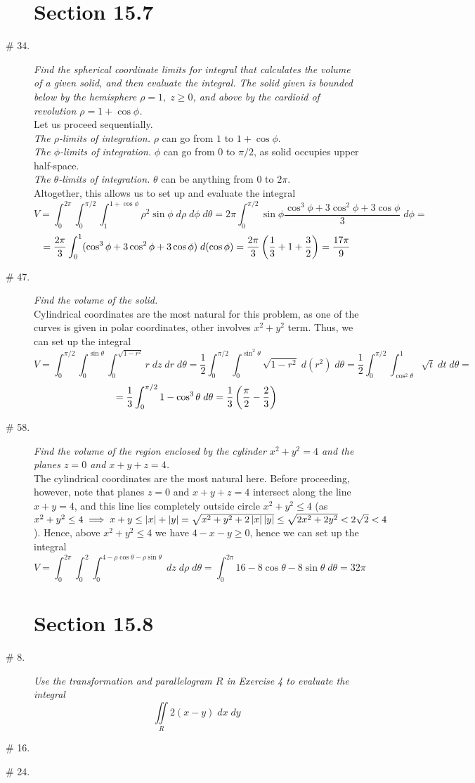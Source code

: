 \documentclass[8pt]{article} %
\newcommand{\dx}{\;dx}
\newcommand{\dy}{\;dy}
\newcommand{\dz}{\;dz}
\newcommand{\dr}{\;dr}
\newcommand{\dph}{\;d\phi}
\newcommand{\drh}{\;d\rho}
\newcommand{\dt}{\;d\theta}
\begin{document}
\begin{description}
\section{Section 15.7}
	\item[\# 34.]{{\it Find the spherical coordinate limits for integral that calculates the volume of a given solid, and then
		evaluate the integral. The solid given is bounded below by the hemisphere $\rho=1,\;z\geq0$, and above by the
		cardioid of revolution $\rho=1+\cos\phi$.}\\
		Let us proceed sequentially.\\
		{\it The $\rho$-limits of integration.} $\rho$ can go from $1$ to $1+\cos\phi$.\\
		{\it The $\phi$-limits of integration.} $\phi$ can go from $0$ to $\pi/2$, as solid occupies upper half-space.\\
		{\it The $\theta$-limits of integration.} $\theta$ can be anything from $0$ to $2\pi$.\\
		Altogether, this allows us to set up and evaluate the integral
		\[V=\int_0^{2\pi}\int_0^{\pi/2}\int_1^{1+\cos\phi}\rho^2\sin\phi\drh\dph\dt=2\pi\int_0^{\pi/2}\sin\phi\frac
		{\cos^3\phi+3\cos^2\phi+3\cos\phi}{3}\dph=\]
		\[=\frac{2\pi}{3}\int_0^1(\cos^3\phi+3\cos^2\phi+3\cos\phi)\;d(\cos\phi)=\frac{2\pi}{3}\left(\frac{1}{3}+1+\frac{3}
		{2}\right)=\frac{17\pi}{9}\]
		}
	\item[\# 47.]{{\it Find the volume of the solid.\\}
		Cylindrical coordinates are the most natural for this problem, as one of the curves is given in polar coordinates,
		other involves $x^2+y^2$ term. Thus, we can set up the integral
		\[V=\int_0^{\pi/2}\int_0^{\sin\theta}\int_0^{\sqrt{1-r^2}}r\dz\dr\dt=\frac{1}{2}\int_0^{\pi/2}\int_0^{\sin^2\theta}
		\sqrt{1-r^2}\;d(r^2)\dt=\frac{1}{2}\int_0^{\pi/2}\int_{\cos^2\theta}^1\sqrt t\;dt\dt=\]
		\[=\frac{1}{3}\int_0^{\pi/2}1-\cos^3\theta\dt=\frac{1}{3}\mybra{\frac{\pi}{2}-\frac{2}{3}}\]
		}
	\item[\# 58.]{{\it Find the volume of the region enclosed by the cylinder $x^2+y^2=4$ and the planes $z=0$ and $x+y+z=4$.}\\
		The cylindrical coordinates are the most natural here. Before proceeding, however, note that planes $z=0$
		and $x+y+z=4$ intersect along the line $x+y=4$, and this line lies completely outside circle $x^2+y^2\leq 4$ (as
		$x^2+y^2\leq 4\implies x+y\leq\left|x\right|+\left|y\right|=\sqrt{x^2+y^2+2\left|x\right|\left|y\right|}\leq \sqrt{2x^2+2y^2}<2\sqrt{2}<4$
		). Hence, above $x^2+y^2\leq 4$ we have $4-x-y\geq 0$, hence we can set up the integral
		\[V=\int_0^{2\pi}\int_0^2\int_0^{4-\rho\cos\theta-\rho\sin\theta}\dz\drh\dt=\int_0^{2\pi}16-8\cos\theta-8\sin\theta\dt
		=32\pi\]
		}
\section{Section 15.8}
	\item[\# 8.]{{\it Use the transformation and parallelogram $R$ in Exercise 4 to evaluate the integral}
		\[\iint\limits_R2(x-y)\dx\dy\]
		}
	\item[\# 16.]{{\it 
		}
		}
	\item[\# 24.]{{\it 
		}
		}
\end{description}
\end{document}
